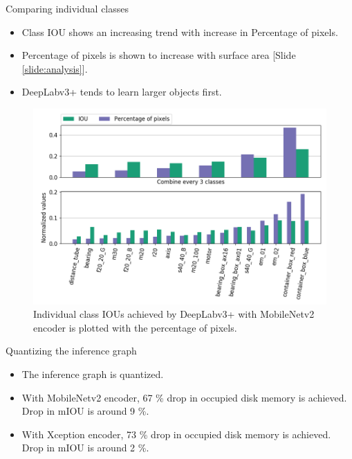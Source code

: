 \documentclass{beamer}
\begin{document}
\begin{frame}{Comparing individual classes}

	\begin{itemize}
		\item Class IOU shows an increasing trend with increase in Percentage of pixels.
		\item Percentage of pixels is shown to increase with surface area [Slide \ref{slide:analysis}].
		\item DeepLabv3+ tends to learn larger objects first.
	\end{itemize}

	\begin{figure}[h]
		\centering
		\includegraphics[width=0.57\linewidth]{images/cls_iou_full}
		\captionsetup{justification=centering,margin=0.2cm}
		\caption{Individual class IOUs achieved by DeepLabv3+ with MobileNetv2 encoder is plotted with the percentage of pixels.}
		\label{Fig:variants}
	\end{figure}

\end{frame}


\begin{frame}{Quantizing the inference graph}

	\begin{itemize}
		\item The inference graph is quantized.
		\item With MobileNetv2 encoder, 67 \% drop in occupied disk memory is achieved. Drop in mIOU is around 9 \%.
		\item With Xception encoder, 73 \% drop in occupied disk memory is achieved. Drop in mIOU is around 2 \%.
	\end{itemize}

	
	
\end{frame}
\end{document}
